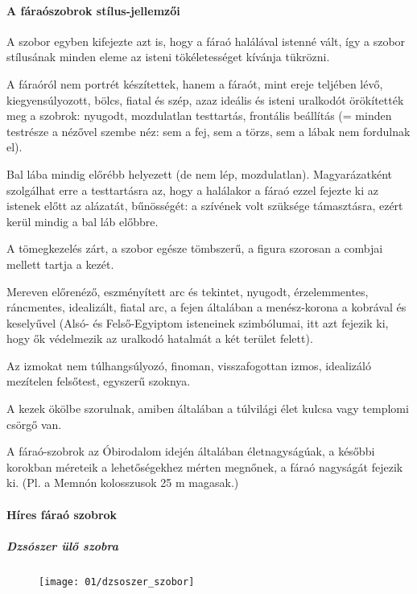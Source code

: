 \paragraph{A fáraószobrok stílus-jellemzői}

A szobor egyben kifejezte azt is, hogy a fáraó halálával istenné vált, így a szobor stílusának minden eleme az isteni tökéletességet kívánja tükrözni.

A fáraóról nem portrét készítettek, hanem a fáraót, mint ereje teljében lévő, kiegyensúlyozott, bölcs, fiatal és szép, azaz ideális és isteni uralkodót örökítették meg a szobrok: nyugodt, mozdulatlan testtartás, frontális beállítás (= minden testrésze a nézővel szembe néz: sem a fej, sem a törzs, sem a lábak nem fordulnak el).

Bal lába mindig előrébb helyezett (de nem lép, mozdulatlan). Magyarázatként szolgálhat erre a testtartásra az, hogy a halálakor a fáraó ezzel fejezte ki az istenek előtt az alázatát, bűnösségét: a szívének volt szüksége támasztásra, ezért kerül mindig a bal láb előbbre.

A tömegkezelés zárt, a szobor egésze tömbszerű, a figura szorosan a combjai mellett tartja a kezét. 

Mereven előrenéző, eszményített arc és tekintet, nyugodt, érzelemmentes, ráncmentes, idealizált, fiatal arc, a fejen általában a menész-korona a kobrával és keselyűvel (Alsó- és Felső-Egyiptom isteneinek szimbólumai, itt azt fejezik ki, hogy ők védelmezik az uralkodó hatalmát a két terület felett).

Az izmokat nem túlhangsúlyozó, finoman, visszafogottan izmos, idealizáló mezítelen felsőtest, egyszerű szoknya.

A kezek ökölbe szorulnak, amiben általában a túlvilági élet kulcsa vagy templomi csörgő van. 

A fáraó-szobrok az Óbirodalom idején általában életnagyságúak, a későbbi korokban méreteik a lehetőségekhez mérten megnőnek, a fáraó nagyságát fejezik ki. (Pl. a Memnón kolosszusok 25 m magasak.)

\paragraph{Híres fáraó szobrok}

	\subparagraph{Dzsószer ülő szobra}
	
	\begin{figure}
		\begin{tcolorbox}[enhanced,colframe=gray!50!white,
			colbacktitle=gray!15!white,
			coltitle=gray!50!black,
			borderline={0.5mm}{0mm}{gray!15!white},
			borderline={0.5mm}{0mm}{gray!50!white,dashed},
			attach boxed title to top center={yshift=-2mm},
			boxed title style={boxrule=0.4pt},
			title=Dzsószer szobra eredeti helyén]{
			\texttt{[image: 01/dzsoszer\_szobor]}}
		\end{tcolorbox}
	\end{figure} 

